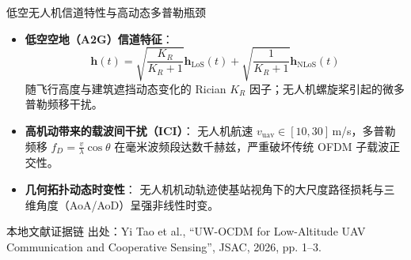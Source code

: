 \documentclass[aspectratio=169, 10pt]{ctexbeamer}
\begin{document}
\begin{frame}{低空无人机信道特性与高动态多普勒瓶颈}
  \begin{itemize}
    \item \textbf{低空空地（A2G）信道特征}：
    \begin{equation*}
      \mathbf{h}(t) = \sqrt{\frac{K_R}{K_R + 1}}\mathbf{h}_{\mathrm{LoS}}(t) + \sqrt{\frac{1}{K_R + 1}}\mathbf{h}_{\mathrm{NLoS}}(t)
    \end{equation*}
    随飞行高度与建筑遮挡动态变化的 Rician $K_R$ 因子；无人机螺旋桨引起的微多普勒频移干扰。
    \item \textbf{高机动带来的载波间干扰（ICI）}：
    无人机航速 $v_{\mathrm{uav}} \in [10, 30]$\,m/s，多普勒频移 $f_D = \frac{v}{\lambda}\cos\theta$ 在毫米波频段达数千赫兹，严重破坏传统 OFDM 子载波正交性。
    \item \textbf{几何拓扑动态时变性}：
    无人机机动轨迹使基站视角下的大尺度路径损耗与三维角度（AoA/AoD）呈强非线性时变。
  \end{itemize}

  \begin{block}{本地文献证据链}
    \footnotesize \textcolor{evidencegray}{出处：Yi Tao et al., ``UW-OCDM for Low-Altitude UAV Communication and Cooperative Sensing'', JSAC, 2026, pp. 1--3.}
  \end{block}
\end{frame}

\end{document}
